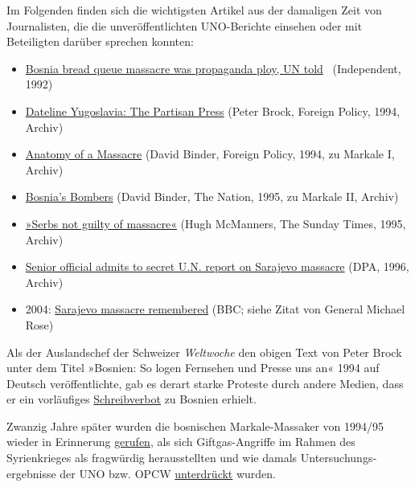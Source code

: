 Im Folgenden finden sich die wichtigsten Artikel aus der damaligen Zeit
von Journalisten, die die unveröffentlichten UNO-Berichte einsehen oder
mit Beteiligten darüber sprechen konnten:

\begin{itemize}
\tightlist
\item
  \href{https://www.independent.co.uk/news/muslims-slaughter-their-own-people-bosnia-bread-queue-massacre-was-propaganda-ploy-un-told-1541801.html}{Bosnia
  bread queue massacre was propaganda ploy, UN told}~ (Independent,
  1992)
\item
  \href{https://swprs.files.wordpress.com/2019/12/dateline-yugoslavia-the-partisan-press_peter-brock_foreign-policy_1994.pdf}{Dateline
  Yugoslavia: The Partisan Press} (Peter Brock, Foreign Policy, 1994,
  Archiv)
\item
  \href{https://swprs.files.wordpress.com/2019/12/anatomy-of-a-massacre_david-binder_foreign-policy_1994.pdf}{Anatomy
  of a Massacre} (David Binder, Foreign Policy, 1994, zu Markale I,
  Archiv)
\item
  \href{https://swprs.files.wordpress.com/2019/12/bosnias-bombers_david-binder_the-nation-1995.pdf}{Bosnia's
  Bombers} (David Binder, The Nation, 1995, zu Markale II, Archiv)
\item
  \href{https://swprs.files.wordpress.com/2019/12/sunday-times_serbs-not-guilty-of-massacre_1995.pdf}{»Serbs
  not guilty of massacre«} (Hugh McManners, The Sunday Times, 1995,
  Archiv)
\item
  \href{https://swprs.files.wordpress.com/2019/12/dpa_un-report-sarajevo_1996.pdf}{Senior
  official admits to secret U.N. report on Sarajevo massacre} (DPA,
  1996, Archiv)
\item
  2004: \href{http://news.bbc.co.uk/2/hi/europe/3459965.stm}{Sarajevo
  massacre remembered} (BBC; siehe Zitat von General Michael Rose)
\end{itemize}

Als der Auslandschef der Schweizer \emph{Weltwoche} den obigen Text von
Peter Brock unter dem Titel »Bosnien: So logen Fernsehen und Presse uns
an« 1994 auf Deutsch veröffentlichte, gab es derart starke Proteste
durch andere Medien, dass er ein vorläufiges
\href{https://swprs.org/das-gewuenschte-narrativ/}{Schreibverbot} zu
Bosnien erhielt.

Zwanzig Jahre später wurden die bosnischen Markale-Massaker von 1994/95
wieder in Erinnerung
\href{https://swprs.files.wordpress.com/2019/12/sarajevo-1995-damscus-2013-mass-attack-deceptions_world-tribune.pdf}{gerufen},
als sich Giftgas-Angriffe im Rahmen des Syrienkrieges als fragwürdig
herausstellten und wie damals Unter­suchungs­ergebnisse der UNO bzw.
OPCW
\href{https://www.dailymail.co.uk/news/article-7793253/PETER-HITCHENS-reveals-evidence-watchdog-suppressed-report-casting-doubt-Assad-gas-attack.html}{unterdrückt}
wurden.

